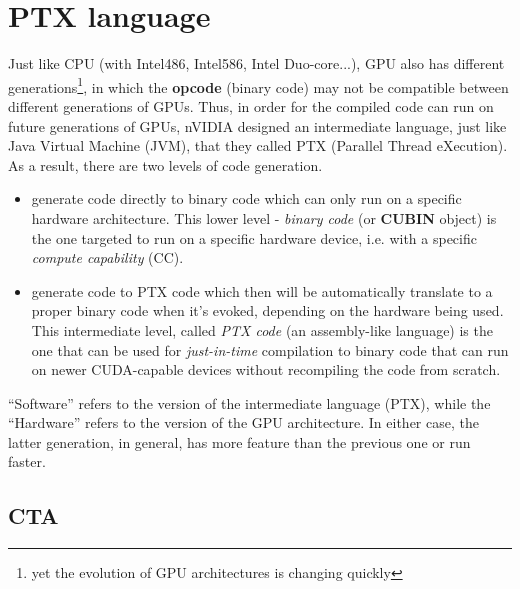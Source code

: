 
\chapter{PTX language}
\label{chap:ptx-language}


Just like CPU (with Intel486, Intel586, Intel Duo-core...), GPU also
has different
generations\footnote{ yet the evolution of GPU architectures is
  changing quickly},
in which the {\bf opcode} (binary code) may not be compatible between
different generations of GPUs. Thus, in order for the compiled code
can run on future generations of GPUs, nVIDIA designed an intermediate
language, just like Java Virtual Machine (JVM), that they called PTX
(Parallel Thread eXecution). As a result, there are two levels of code
generation.
\begin{itemize}
\item generate code directly to binary code which can only run on a
  specific hardware architecture. This lower level - {\it binary code}
  (or {\bf CUBIN} object) is the one targeted to run on a specific
  hardware device, i.e.  with a specific {\it compute capability}
  (CC).

\item generate code to PTX code which then will be automatically
  translate to a proper binary code when it's evoked, depending on the
  hardware being used.  This intermediate level, called {\it PTX code}
  (an assembly-like language) is the one that can be used for
  {\it just-in-time} compilation to binary code that can run on newer
  CUDA-capable devices without recompiling the code from scratch.
\end{itemize}


\begin{framed}
  ``Software'' refers to the version of the intermediate language
  (PTX), while the ``Hardware'' refers to the version of the GPU
  architecture. In either case, the latter generation, in general, has
  more feature than the previous one or run faster.
\end{framed}

\section{CTA}
\label{sec:cta}


